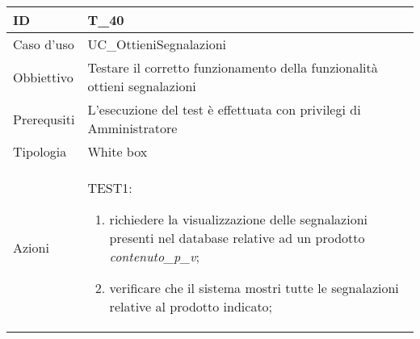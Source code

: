 \begin{table}[hb]
    \centering
    \begin{tabular}{ |p{2cm}|p{10cm}|  }
        \hline
        ID          & T\_40                                                                              \\\hline
        Caso d'uso  & UC\_OttieniSegnalazioni                                                           \\\hline
        Obbiettivo  & Testare il corretto funzionamento della funzionalità ottieni segnalazioni \\\hline
        Prerequsiti & L'esecuzione del test è effettuata con privilegi di Amministratore                         \\\hline
        Tipologia   & White box                                                                          \\\hline
        Azioni      &
        TEST1:
        \begin{enumerate}[nosep, topsep=0pt]
            \item richiedere la visualizzazione delle segnalazioni presenti nel database relative ad un prodotto \emph{contenuto\_p\_v};
            \item verificare che il sistema mostri tutte le segnalazioni relative al prodotto indicato;
        \end{enumerate}
        \\\hline
    \end{tabular}
\end{table}














































